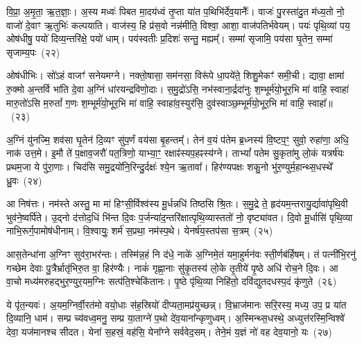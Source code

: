 वि॒प्रा॒ अ॒मृ॒ता॒ ऋ॒त॒ज्ञाः॒। अ॒स्य मध्वः॑ पिबत मा॒दय॑ध्वं तृ॒प्ता या॑त प॒थिभि॑र्देव॒यानैः᳚। वाजः॑ पु॒रस्ता॑दु॒त म॑ध्य॒तो नो॒ वाजो॑ दे॒वाꣳ ऋ॒तुभिः॑ कल्पयाति। वाज॑स्य॒ हि प्र॑स॒वो नन्न॑मीति॒ विश्वा॒ आशा॒ वाज॑पतिर्भवेयम्। पयः॑ पृथि॒व्यां पय॒ ओष॑धीषु॒ पयो॑ दिव्य॒न्तरि॑क्षे॒ पयो॑ धाम्। पय॑स्वतीः प्र॒दिशः॑ सन्तु॒ मह्यम्᳚। सम्मा॑ सृजामि॒ पय॑सा घृ॒तेन॒ सम्मा॑ सृजाम्य॒पः~(२२)

ओष॑धीभिः। सो॑\-ऽहं वाजꣳ॑ सनेयमग्ने। नक्तो॒षासा॒ सम॑नसा॒ विरू॑पे धा॒पये॑ते॒ शिशु॒मेकꣳ॑ समी॒ची। द्यावा॒ क्षामा॑ रु॒क्मो अ॒न्तर्वि भा॑ति दे॒वा अ॒ग्निं धा॑रयन्द्रविणो॒दाः। स॒मु॒द्रो॑\-ऽसि॒ नभ॑स्वाना॒र्द्रदा॑नुः श॒म्भूर्म॑यो॒भूर॒भि मा॑ वाहि॒ स्वाहा॑ मारु॒तो॑\-ऽसि म॒रुतां᳚ ग॒णः श॒म्भूर्म॑यो॒भूर॒भि मा॑ वाहि॒ स्वाहा॑व॒स्युर॑सि॒ दुव॑स्वाञ्छ॒म्भूर्म॑यो॒भूर॒भि मा॑ वाहि॒ स्वाहा᳚॥~(२३)

{\anuvakamend[{धने᳚ष्व॒पो दुव॑स्वाञ्छ॒म्भूर्म॑यो॒भूर॒भि मा॒ द्वे च॑}]}%

अ॒ग्निं यु॑नज्मि॒ शव॑सा घृ॒तेन॑ दि॒व्यꣳ सु॑प॒र्णं वय॑सा बृ॒हन्तम्᳚। तेन॑ व॒यं प॑तेम ब्र॒ध्नस्य॑ वि॒ष्टप॒ꣳ॒ सुवो॒ रुहा॑णा॒ अधि॒ नाक॑ उत्त॒मे। इ॒मौ ते॑ प॒क्षाव॒जरौ॑ पत॒त्रिणो॒ याभ्या॒ꣳ॒ रक्षाꣴ॑स्यप॒हꣴस्य॑ग्ने। ता\-भ्यां᳚ पतेम सु॒कृता॑मु लो॒कं यत्रर्\mbox{}ष॑यः प्रथम॒जा ये पु॑रा॒णाः। चिद॑सि समु॒द्रयो॑नि॒रिन्दु॒र्दक्षः॑ श्ये॒न ऋ॒तावा᳚। हिर॑ण्यपक्षः शकु॒नो भु॑र॒ण्युर्म॒हान्थ्स॒धस्थे᳚ ध्रु॒वः~(२४)

आ निष॑त्तः। नम॑स्ते अस्तु॒ मा मा॑ हिꣳसी॒र्विश्व॑स्य मू॒र्धन्नधि॑ तिष्ठसि श्रि॒तः। स॒मु॒द्रे ते॒ हृद॑यम॒न्तरायु॒र्द्यावा॑पृथि॒वी भुव॑ने॒ष्वर्पि॑ते। उ॒द्नो द॑त्तोद॒धिं भि॑न्त दि॒वः प॒र्जन्या॑द॒न्तरि॑क्षात्पृथि॒व्यास्ततो॑ नो॒ वृष्ट्या॑वत। दि॒वो मू॒र्धासि॑ पृथि॒व्या नाभि॒रूर्ग॒पामोष॑धीनाम्। वि॒श्वायुः॒ शर्म॑ स॒प्रथा॒ नम॑स्प॒थे। येनर्\mbox{}ष॑य॒स्तप॑सा स॒त्रम्~(२५)

आस॒तेन्धा॑ना अ॒ग्निꣳ सुव॑रा॒भर॑न्तः। तस्मि॑न्न॒हं नि द॑धे॒ नाके॑ अ॒ग्निमे॒तं यमा॒हुर्मन॑वः स्ती॒र्णब॑र्\mbox{}हिषम्। तं पत्नी॑भि॒रनु॑ गच्छेम देवाः पु॒त्रैर्भ्रातृ॑भिरु॒त वा॒ हिर॑ण्यैः। नाकं॑ गृह्णा॒नाः सु॑कृ॒तस्य॑ लो॒के तृ॒तीये॑ पृ॒ष्ठे अधि॑ रोच॒ने दि॒वः। आ वा॒चो मध्य॑मरुहद्भुर॒ण्युर॒यम॒ग्निः सत्प॑ति॒श्चेकि॑तानः। पृ॒ष्ठे पृ॑थि॒व्या निहि॑तो॒ दवि॑द्युतदधस्प॒दं कृ॑णुते~(२६)

ये पृ॑त॒न्यवः॑। अ॒यम॒ग्निर्वी॒रत॑मो वयो॒धाः स॑ह॒स्रियो॑ दीप्यता॒मप्र॑युच्छन्न्। वि॒भ्राज॑मानः सरि॒रस्य॒ मध्य॒ उप॒ प्र या॑त दि॒व्यानि॒ धाम॑। सम्प्र च्य॑वध्व॒मनु॒ सम्प्र या॒ताग्ने॑ प॒थो दे॑व॒याना᳚न्कृणुध्वम्। अ॒स्मिन्थ्स॒धस्थे॒ अध्युत्त॑रस्मि॒न्विश्वे॑ देवा॒ यज॑मानश्च सीदत। येना॑ स॒हस्रं॒ वह॑सि॒ येना᳚ग्ने सर्ववेद॒सम्। तेने॒मं य॒ज्ञं नो॑ वह देव॒यानो॒ यः~(२७)

